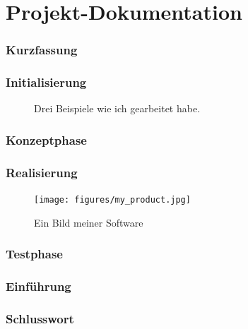 \documentclass{article}
\begin{document}
\part{Projekt-Dokumentation}
\section{Kurzfassung}
\section{Initialisierung}
\begin{figure}[h!]
    \hfill
    \hfill
    \label{me_working}
    \caption{Drei Beispiele wie ich gearbeitet habe.}
\end{figure}
\section{Konzeptphase}
\section{Realisierung}
\begin{figure}[h!]
    \centering
    \texttt{[image: figures/my\_product.jpg]}
    \caption{Ein Bild meiner Software}
    \label{my_product}
\end{figure}
\section{Testphase}
\section{Einführung}
\section{Schlusswort}


\newpage

\setcounter{tocdepth}{1}
\listoffigures

\newpage
\printglossary[type=\acronymtype]
\newpage
\printglossary
\end{document}

